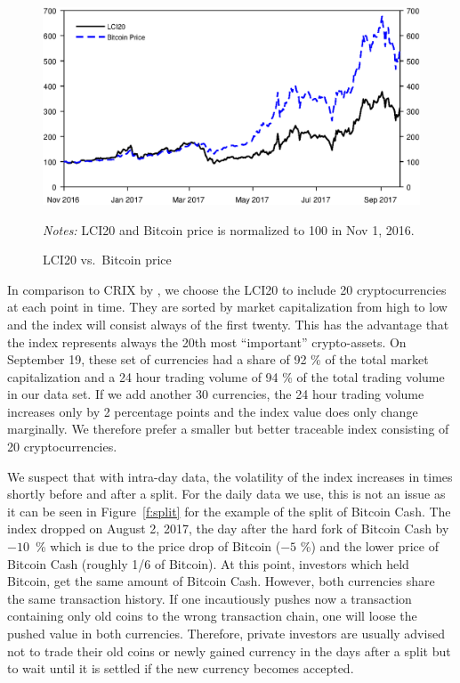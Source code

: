 \documentclass[11pt]{article}
\newcommand\fnotes[1]{\captionsetup{font=scriptsize}\caption*{\textsl{Notes:} #1}}
\begin{document}
 \begin{figure}[ht]%
     \centering%
     \caption{LCI20 vs.\ Bitcoin price}\label{f:lci20vsBTC}%
     \includegraphics[width=.8\textwidth]{figs/lci20_vs_btc.eps}%
     \smallskip\newline%
     \fnotes{LCI20 and Bitcoin price is normalized to 100 in Nov 1, 2016.}
 \end{figure}

In comparison to CRIX by \cite{Trimborn2016}, we choose the LCI20 to include 20 cryptocurrencies at each point in time.
They are sorted by market capitalization from high to low and the index will consist always of the first twenty.
This has the advantage that the index represents always the 20th most ``important'' crypto-assets.
On September 19, these set of currencies had a share of 92 \% of the total market capitalization and a 24 hour trading volume of 94 \% of the total trading volume in our data set.
If we add another 30 currencies, the 24 hour trading volume increases only by 2 percentage points and the index value does only change marginally.
We therefore prefer a smaller but better traceable index consisting of 20 cryptocurrencies.

We suspect that with intra-day data, the volatility of the index increases in times shortly before and after a split.
For the daily data we use, this is not an issue as it can be seen in Figure~\ref{f:split} for the example of the split of Bitcoin Cash.
The index dropped on August 2, 2017, the day after the hard fork of Bitcoin Cash by $-10$~\% which is due to the price drop of Bitcoin ($-5$ \%) and the lower price of Bitcoin Cash (roughly 1/6 of Bitcoin).
At this point, investors which held Bitcoin, get the same amount of Bitcoin Cash.
However, both currencies share the same transaction history.
If one incautiously pushes now a transaction containing only old coins to the wrong transaction chain, one will loose the pushed value in both currencies.
Therefore, private investors are usually advised not to trade their old coins or newly gained currency in the days after a split but to wait until it is settled if the new currency becomes accepted.
\end{document}
